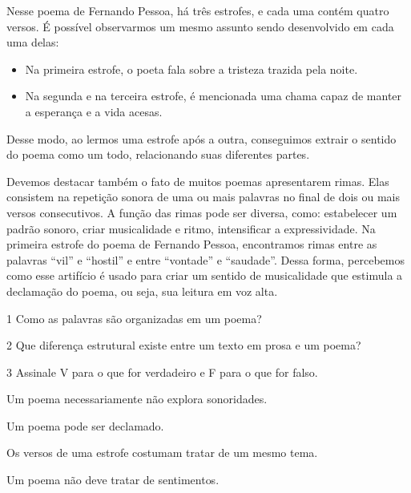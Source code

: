 {Nesse poema de Fernando Pessoa, há três estrofes, e cada
uma contém quatro versos. É possível observarmos um
mesmo assunto sendo desenvolvido em cada uma delas:

\begin{itemize}
\item Na primeira estrofe, o poeta fala sobre a tristeza trazida pela noite.

\item Na segunda e na terceira estrofe, é mencionada uma chama capaz de manter a esperança e a vida
acesas.
\end{itemize}

Desse modo, ao lermos uma estrofe após a outra, conseguimos
extrair o sentido do poema como um todo, relacionando suas diferentes
partes.

Devemos destacar também o fato de muitos poemas apresentarem rimas. Elas
consistem na repetição sonora de uma ou mais palavras no final de dois
ou mais versos consecutivos. A função das rimas pode ser diversa, como:
estabelecer um padrão sonoro, criar musicalidade e ritmo, intensificar a
expressividade. Na primeira estrofe do poema de Fernando
Pessoa, encontramos rimas entre as palavras “vil” e “hostil” e entre “vontade”
e “saudade”. Dessa forma, percebemos como esse artifício é usado
para criar um sentido de musicalidade que estimula a declamação do
poema, ou seja, sua leitura em voz alta.}


\num{1} Como as palavras são organizadas em um poema?


\num{2} Que diferença estrutural existe entre um texto em prosa e um poema?


\num{3} Assinale V para o que for verdadeiro e F para o que for falso.

\begin{boxlist}
 Um poema necessariamente não explora sonoridades.

 Um poema pode ser declamado.

 Os versos de uma estrofe costumam tratar de um mesmo tema.

 Um poema não deve tratar de sentimentos.
\end{boxlist}

